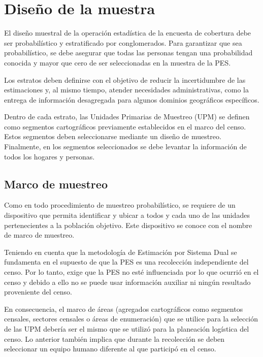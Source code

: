 \documentclass[
  12pt,
]{book}
\begin{document}
\section{Diseño de la muestra}\label{diseuxf1o-de-la-muestra}

El diseño muestral de la operación estadística de la encuesta de cobertura debe ser probabilístico y estratificado por conglomerados. Para garantizar que sea probabilístico, se debe asegurar que todas las personas tengan una probabilidad conocida y mayor que cero de ser seleccionadas en la muestra de la PES.

Los estratos deben definirse con el objetivo de reducir la incertidumbre de las estimaciones y, al mismo tiempo, atender necesidades administrativas, como la entrega de información desagregada para algunos dominios geográficos específicos.

Dentro de cada estrato, las Unidades Primarias de Muestreo (UPM) se definen como segmentos cartográficos previamente establecidos en el marco del censo. Estos segmentos deben seleccionarse mediante un diseño de muestreo. Finalmente, en los segmentos seleccionados se debe levantar la información de todos los hogares y personas.

\subsection{Marco de muestreo}\label{marco-de-muestreo}

Como en todo procedimiento de muestreo probabilístico, se requiere de un dispositivo que permita identificar y ubicar a todos y cada uno de las unidades pertenecientes a la población objetivo. Este dispositivo se conoce con el nombre de marco de muestreo.

Teniendo en cuenta que la metodología de Estimación por Sistema Dual se fundamenta en el supuesto de que la PES es una recolección independiente del censo. Por lo tanto, exige que la PES no esté influenciada por lo que ocurrió en el censo y debido a ello no se puede usar información auxiliar ni ningún resultado proveniente del censo.

En consecuencia, el marco de áreas (agregados cartográficos como segmentos censales, sectores censales o áreas de enumeración) que se utilice para la selección de las UPM debería ser el mismo que se utilizó para la planeación logística del censo. Lo anterior también implica que durante la recolección se deben seleccionar un equipo humano diferente al que participó en el censo.
\end{document}
